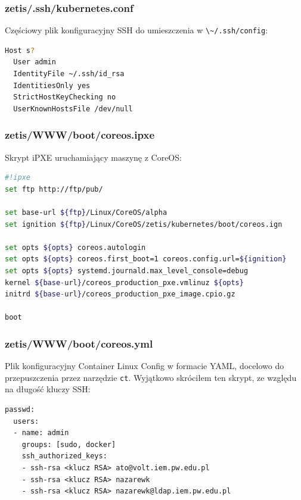 \documentclass[a4paper,12pt,twoside,openany]{report}
\newcommand{\passthrough}[1]{#1}
\begin{document}
\hypertarget{zetis.sshkubernetes.conf}{%
\subsubsection{zetis/.ssh/kubernetes.conf}\label{zetis.sshkubernetes.conf}}

Częściowy plik konfiguracyjny SSH do umieszczenia w
\passthrough{\lstinline!\~/.ssh/config!}:

\begin{lstlisting}[language=bash]
Host s?
  User admin
  IdentityFile ~/.ssh/id_rsa
  IdentitiesOnly yes
  StrictHostKeyChecking no
  UserKnownHostsFile /dev/null
\end{lstlisting}

\hypertarget{zetiswwwbootcoreos.ipxe-1}{%
\subsubsection{zetis/WWW/boot/coreos.ipxe}\label{zetiswwwbootcoreos.ipxe-1}}

Skrypt iPXE uruchamiający maszynę z CoreOS:

\begin{lstlisting}[language=bash]
#!ipxe
set ftp http://ftp/pub/

set base-url ${ftp}/Linux/CoreOS/alpha
set ignition ${ftp}/Linux/CoreOS/zetis/kubernetes/boot/coreos.ign

set opts ${opts} coreos.autologin
set opts ${opts} coreos.first_boot=1 coreos.config.url=${ignition}
set opts ${opts} systemd.journald.max_level_console=debug
kernel ${base-url}/coreos_production_pxe.vmlinuz ${opts}
initrd ${base-url}/coreos_production_pxe_image.cpio.gz

boot
\end{lstlisting}

\hypertarget{zetiswwwbootcoreos.yml-1}{%
\subsubsection{zetis/WWW/boot/coreos.yml}\label{zetiswwwbootcoreos.yml-1}}

Plik konfiguracyjny Container Linux Config w formacie YAML, docelowo do
przepuszczenia przez narzędzie \passthrough{\lstinline!ct!}. Wyjątkowo
skróciłem ten skrypt, ze względu na długość kluczy SSH:

\begin{lstlisting}
passwd:
  users:
  - name: admin
    groups: [sudo, docker]
    ssh_authorized_keys:
    - ssh-rsa <klucz RSA> ato@volt.iem.pw.edu.pl
    - ssh-rsa <klucz RSA> nazarewk
    - ssh-rsa <klucz RSA> nazarewk@ldap.iem.pw.edu.pl
\end{lstlisting}
\end{document}

